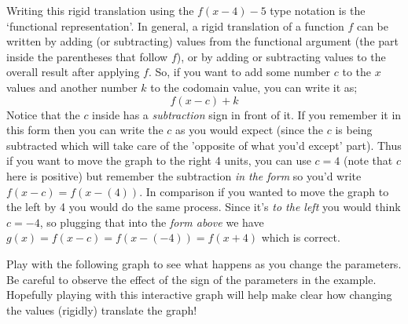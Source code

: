 \documentclass{ximeraXloud}
\begin{document}
    
    Writing this rigid translation using the $f(x-4)-5$ type notation is the `functional representation'. In general, a rigid translation of a function $f$ can be written by adding (or subtracting) values from the functional argument (the part inside the parentheses that follow $f$), or by adding or subtracting values to the overall result after applying $f$. So, if you want to add some number $c$ to the $x$ values and another number $k$ to the codomain value, you can write it as;
    \[
        f(x - c) + k
    \]
    Notice that the $c$ inside has a \textit{subtraction} sign in front of it. If you remember it in this form then you can write the $c$ as you would expect (since the $c$ is being subtracted which will take care of the 'opposite of what you'd except' part). Thus if you want to move the graph to the right 4 units, you can use $c=4$ (note that $c$ here is positive) but remember the subtraction \textit{in the form} so you'd write $f(x - c) = f(x - (4))$. In comparison if you wanted to move the graph to the left by 4 you would do the same process. Since it's \textit{to the left} you would think $c = -4$, so plugging that into the \textit{form above} we have $g(x) = f(x - c) = f(x - (-4) ) = f(x+4)$ which is correct.
    
    Play with the following graph to see what happens as you change the parameters. Be careful to observe the effect of the sign of the parameters in the example. Hopefully playing with this interactive graph will help make clear how changing the values (rigidly) translate the graph!
    
    
\end{document}
